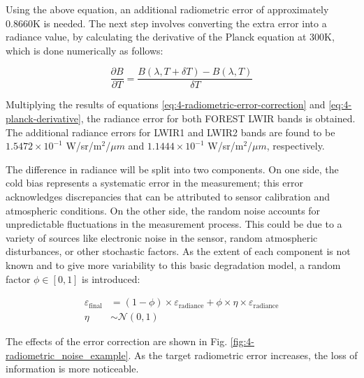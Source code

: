         Using the above equation, an additional radiometric error of approximately 0.8660K is needed. The next step involves converting the extra error into a radiance value, by calculating the derivative of the Planck equation at 300K, which is done numerically as follows:
        
        \begin{equation}
            \frac{\partial B}{\partial T} = \frac{B(\lambda, T + \delta T) - B(\lambda, T)}{\delta T}
            \label{eq:4-planck-derivative}
        \end{equation}  
        
        Multiplying the results of equations \ref{eq:4-radiometric-error-correction} and \ref{eq:4-planck-derivative}, the radiance error for both FOREST LWIR bands is obtained. The additional radiance errors for LWIR1 and LWIR2 bands are found to be \(1.5472 \times 10^{-1}\) W/sr/m\(^2\)/\(\mu m\) and \(1.1444 \times 10^{-1}\) W/sr/m\(^2\)/\(\mu m\), respectively.

        The difference in radiance will be split into two components. On one side, the cold bias represents a systematic error in the measurement; this error acknowledges discrepancies that can be attributed to sensor calibration and atmospheric conditions. On the other side, the random noise accounts for unpredictable fluctuations in the measurement process. This could be due to a variety of sources like electronic noise in the sensor, random atmospheric disturbances, or other stochastic factors. As the extent of each component is not known and to give more variability to this basic degradation model, a random factor $\phi \in [0,1] $ is introduced:

        \begin{equation}
        \begin{aligned}
            \varepsilon_{\text{final}} &= (1 - \phi) \times \varepsilon_{\text{radiance}} + \phi \times \eta \times \varepsilon_{\text{radiance}} \\
            \eta & \sim \mathcal{N} (0,1)
        \end{aligned}
        \end{equation}    

        The effects of the error correction are shown in Fig. \ref{fig:4-radiometric_noise_example}. As the target radiometric error increases, the loss of information is more noticeable.


